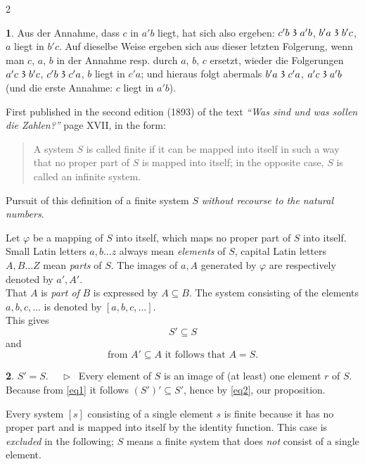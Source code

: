 \documentclass[leqno,hidelinks,10pt]{article}
\theoremstyle{definition}
\newtheorem{satz}{\protect\satzname}
\newcommand{\satzname}{}
\renewcommand{\satzname}{\hspace{-4pt}.\ Satz}%
\renewcommand{\satzname}{\hspace{-4pt}.\ Theorem}%
\newcommand\Beweis{\medskip \newline $ \phantom{'.'} \rhd \ $}%
\newcommand\TeilVon{\mathrel{\raisebox{0.45ex}{$\mathfrak{3}$}}}
\newcommand{\partof}{\subseteq}
\begin{document}
\begin{paracol}{2}
\begin{leftcolumn}
\begin{satz}
Aus der Annahme, dass $c$ in $a'b$ liegt, hat sich also ergeben: $c'b \TeilVon a'b$,
$b'a \TeilVon b'c$, $a$ liegt in $b'c$. Auf dieselbe Weise ergeben sich aus
dieser letzten Folgerung, wenn man $c$, $a$, $b$ in der Annahme resp. durch $a$,
$b$, $c$ ersetzt, wieder die Folgerungen $a'c \TeilVon b'c$, $c'b \TeilVon c'a$,
$b$ liegt in $c'a$; und hieraus folgt abermals $b'a \TeilVon c'a$,
$a'c \TeilVon a'b$ (und die erste Annahme: $c$ liegt in $a'b$).
\end{satz}
\newpage
\end{leftcolumn}


\begin{rightcolumn}


\noindent First published in the second edition (1893) of the text
\textit{``Was sind und was sollen die Zahlen?''} page XVII, in the form:%

\begin{quote}
A system $S$ is called finite if it can be mapped into itself in such a way that
no proper part of $S$ is mapped into itself; in the opposite case, $S$ is called
an infinite system.
\end{quote}

Pursuit of this definition of a finite system $S$ \emph{without recourse to the natural numbers}.

Let $\varphi$ be a mapping of $S$ into itself, which maps no proper part of $S$
into itself. Small Latin letters $a, b \ldots z$ always mean \emph{elements} of
$S$, capital Latin letters $A, B \ldots Z$ mean \emph{parts} of $S$. The images
of $a, A$ generated by $\varphi$ are respectively denoted by $a', A'$.
\ \\

That $A$ is \emph{part of} $B$ is expressed by $A \partof B$. The system consisting
of the elements $a, b, c, \ldots$ is denoted by $[a, b, c, \ldots]$.
\ \\

This gives
\begin{equation}\label{eq1}
				S' \partof S
\end{equation}
and %
\begin{equation}\label{eq2}
		\text{from } A' \partof A \text{ it follows that } A = S.
\end{equation}

\begin{satz}\label{thm1}$S' = S$.
\Beweis
Every element of $S$ is an image of (at least) one element $r$ of $S$. Because
from \eqref{eq1} it follows $(S')' \partof S'$, hence by \eqref{eq2}, our proposition.
\end{satz}
Every system $[s]$ consisting of a single element $s$ is finite because it has
no proper part and is mapped into itself by the identity function. This case is
\emph{excluded} in the following; $S$ means a finite system that does \emph{not}
consist of a single element.


\end{rightcolumn}
\end{paracol}
\end{document}
